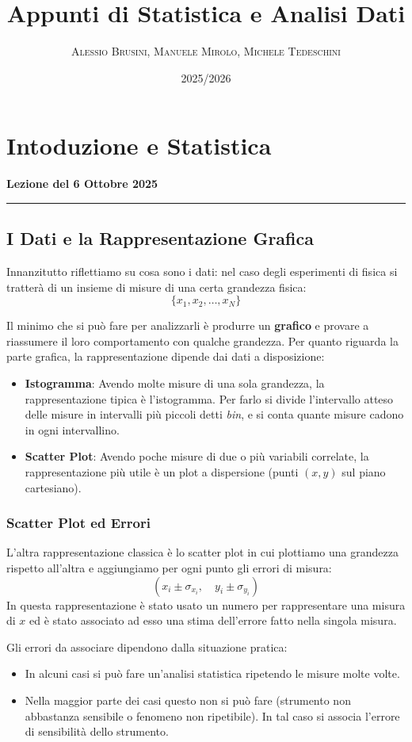 \documentclass[a4paper,11pt]{article}
\title{\textbf{\Huge Appunti di Statistica e Analisi Dati}}
\author{\textsc{Alessio Brusini, Manuele Mirolo, Michele Tedeschini}}
\date{2025/2026}
\theoremstyle{remark}
\newcommand{\thelezione}{}
\newcommand{\lezione}[2]{
\newpage
\renewcommand{\thelezione}{#2} %
\section{#1} %
\noindent\textbf{\color{RoyalBlue}Lezione del #2}\par\vspace{0.5em}\hrule\vspace{1em}
}
\begin{document}
\maketitle
\tableofcontents
\newpage

\lezione{Intoduzione e Statistica}{6 Ottobre 2025}

\subsection{I Dati e la Rappresentazione Grafica}
Innanzitutto riflettiamo su cosa sono i dati: nel caso degli esperimenti di fisica si tratterà di un insieme di misure di una certa grandezza fisica:
\[ \{ x_1, x_2, \dots, x_N \} \]

Il minimo che si può fare per analizzarli è produrre un \textbf{grafico} e provare a riassumere il loro comportamento con qualche grandezza.
Per quanto riguarda la parte grafica, la rappresentazione dipende dai dati a disposizione:
\begin{itemize}
    \item \textbf{Istogramma}: Avendo molte misure di una sola grandezza, la rappresentazione tipica è l'istogramma. Per farlo si divide l'intervallo atteso delle misure in intervalli più piccoli detti \textit{bin}, e si conta quante misure cadono in ogni intervallino.
    \item \textbf{Scatter Plot}: Avendo poche misure di due o più variabili correlate, la rappresentazione più utile è un plot a dispersione (punti $(x,y)$ sul piano cartesiano).
\end{itemize}

\subsubsection{Scatter Plot ed Errori}
L'altra rappresentazione classica è lo scatter plot in cui plottiamo una grandezza rispetto all'altra e aggiungiamo per ogni punto gli errori di misura:
\[ (x_i \pm \sigma_{x_i}, \quad y_i \pm \sigma_{y_i}) \]
In questa rappresentazione è stato usato un numero per rappresentare una misura di $x$ ed è stato associato ad esso una stima dell'errore fatto nella singola misura.

Gli errori da associare dipendono dalla situazione pratica:
\begin{itemize}
    \item In alcuni casi si può fare un'analisi statistica ripetendo le misure molte volte.
    \item Nella maggior parte dei casi  questo non si può fare (strumento non abbastanza sensibile o fenomeno non ripetibile). In tal caso si associa l'errore di sensibilità dello strumento.
\end{itemize}
\end{document}
